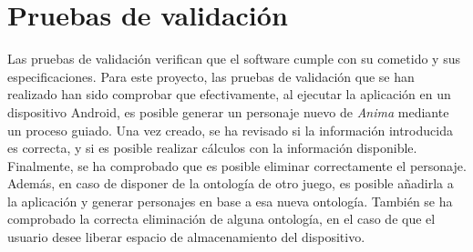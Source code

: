 
\section{Pruebas de validación}
Las pruebas de validación verifican que el software cumple con su cometido y sus especificaciones.
Para este proyecto, las pruebas de validación que se han realizado han sido comprobar que 
efectivamente, al ejecutar la aplicación en un dispositivo Android, es posible generar 
un personaje nuevo de \textit{Anima} mediante un proceso guiado. Una vez creado, se ha revisado 
si la información introducida es correcta, y si es posible realizar cálculos con la información 
disponible. Finalmente, se ha comprobado que es posible eliminar correctamente el personaje.
Además, en caso de disponer de la ontología de otro juego, es posible añadirla a 
la aplicación y generar personajes en base a esa nueva ontología. También se ha comprobado 
la correcta eliminación de alguna ontología, en el caso de que el usuario desee liberar 
espacio de almacenamiento del dispositivo.